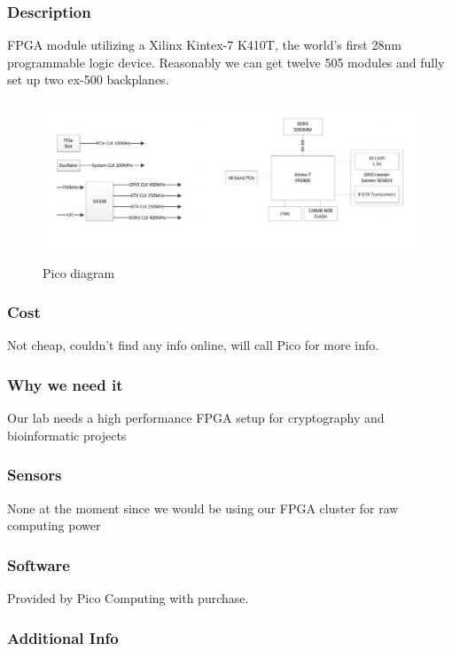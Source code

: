 \documentclass[12pt]{article}
\begin{document}
\subsubsection{Description}
FPGA module utilizing a Xilinx Kintex-7 K410T, the world’s first 28nm
programmable logic device. Reasonably we can get twelve 505 modules and fully
set up two ex-500 backplanes.

\begin{figure}[h!]
  \centering
  \includegraphics[scale=.5]{images/picoFlowChart.png}
  \label{img:picoFlow}
  \caption{Pico diagram}
\end{figure}

\subsubsection{Cost}

Not cheap, couldn't find any info online, will call Pico for more info.

\subsubsection{Why we need it}

Our lab needs a high performance FPGA setup for cryptography and bioinformatic projects

\subsubsection{Sensors}

None at the moment since we would be using our FPGA cluster for raw computing power

\subsubsection{Software}

Provided by Pico Computing with purchase.

\subsubsection{Additional Info}
\end{document}
